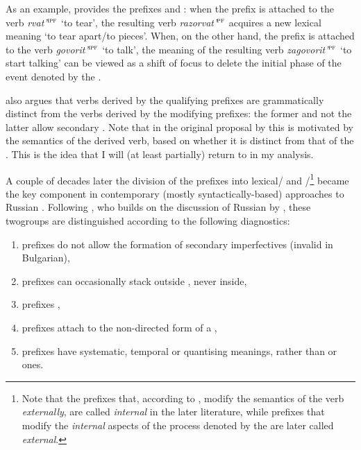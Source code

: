 As an example, \citet{Isachenko:60} provides the prefixes  and : when the prefix  is attached to the verb \textit{rvat'}$^{\textsc{ipf}}$ `to tear', the resulting verb \textit{razorvat'}$^{\textsc{pf}}$ acquires a new lexical meaning `to tear apart/to pieces'. When, on the other hand, the prefix  is attached to the verb \textit{govorit'}$^{\textsc{ipf}}$ `to talk', the meaning of the resulting verb \textit{zagovorit'}$^{\textsc{pf}}$ `to start talking' can be viewed as a shift of focus to delete the initial phase of the event denoted by the .

\citet{Isachenko:60} also argues that verbs derived by the qualifying prefixes are grammatically distinct from the verbs derived by the modifying prefixes: the former and not the latter allow secondary . Note that in the original proposal by \citet{Isachenko:60} this is motivated by the semantics of the derived verb, based on whether it is distinct from that of the . This is the idea that I will (at least partially) return to in my analysis.

A couple of decades later the division of the prefixes into lexical\slash {} and \slash {}\footnote{Note that the prefixes that, according to \citet{Isachenko:60}, modify the semantics of the verb \textit{externally}, are called \textit{internal} in the later literature, while prefixes that modify the \textit{internal} aspects of the process denoted by the  are later called \textit{external}.} became the key component in contemporary (mostly syn\-tac\-tically-based) approaches to Russian  \citep{Schoorlemmer:95, Babko-Malaya:99, Borik:02, Gehrke:04, Ramchand:04, Romanova:04, Romanova:06, Svenonius:04a, Svenonius:04b, DiSciullo:05}. Following \citet[229]{Svenonius:04b}, who builds on the discussion of Russian by \citet{Schoorlemmer:95}, these two\linebreak groups are distinguished according to the following diagnostics:

\begin{enumerate}
\item {} prefixes do not allow the formation of secondary imperfectives (invalid in Bulgarian), 
\item {} prefixes can occasionally stack outside , never inside, 
\item {} prefixes , 
\item {} prefixes attach to the non-directed form of a ,
\item {} prefixes have systematic, temporal or quantising meanings, rather than  or  ones.
\end{enumerate}

